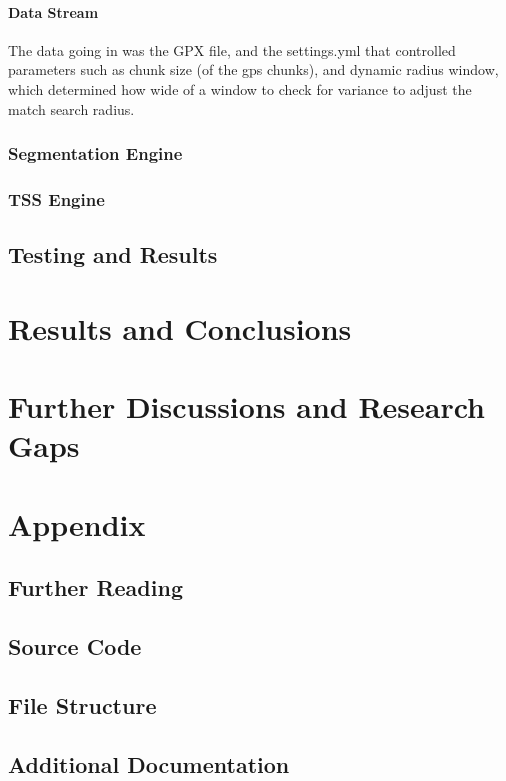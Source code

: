 \documentclass[11pt,a4paper]{report}
\begin{document}
\subsubsection{Data Stream}
The data going in was the GPX file, and the settings.yml that controlled parameters such as chunk size (of the gps chunks), and dynamic radius window, which determined how wide of a window to check for variance to adjust the match search radius.

\subsection{Segmentation Engine}

\subsection{TSS Engine}

\section{Testing and Results}

\chapter{Results and Conclusions}
\label{chap:results}

\chapter{Further Discussions and Research Gaps}
\label{chap:discussion}

\appendix
\chapter{Appendix}
\label{chap:appendix}
\section{Further Reading}

\section{Source Code}

\section{File Structure}

\section{Additional Documentation}



\end{document}
